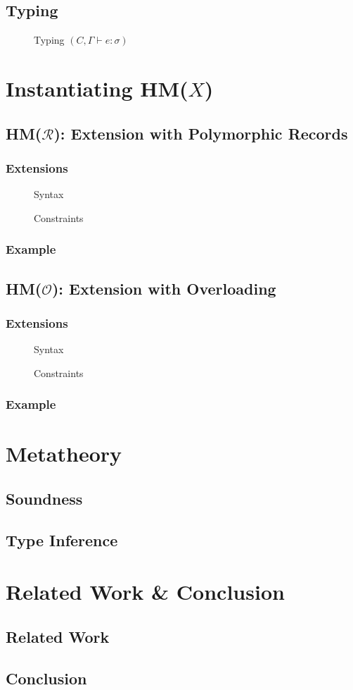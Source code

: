\documentclass[runningheads]{llncs}
\newcommand{\hmx}{HM($X$)}
\newcommand{\hmr}{HM($\mathcal{R}$)}
\newcommand{\hmo}{HM($\mathcal{O}$)}
\begin{document}
\subsection{Typing}
\begin{figure}[t]
  \centering
  \caption{Typing $(C, Γ ⊢ e : σ)$}
\end{figure}
\section{Instantiating \hmx{}}
\subsection{\hmr{}: Extension with Polymorphic Records}
\subsubsection{Extensions}
\begin{figure}[t]
  \centering
  \caption{Syntax}
\end{figure}
\begin{figure}[t]
  \centering
  \caption{Constraints}
\end{figure}
\subsubsection{Example}
\subsection{\hmo{}: Extension with Overloading}
\subsubsection{Extensions}
\begin{figure}[t]
  \centering
  \caption{Syntax}
\end{figure}
\begin{figure}[t]
  \centering
  \caption{Constraints}
\end{figure}
\subsubsection{Example}
\section{Metatheory}
\subsection{Soundness}
\subsection{Type Inference}
\section{Related Work \& Conclusion}
\subsection{Related Work}
\subsection{Conclusion}

\nocite{hmx}
\nocite{sts}
\nocite{atapl}
\printbibliography{}
\end{document}

